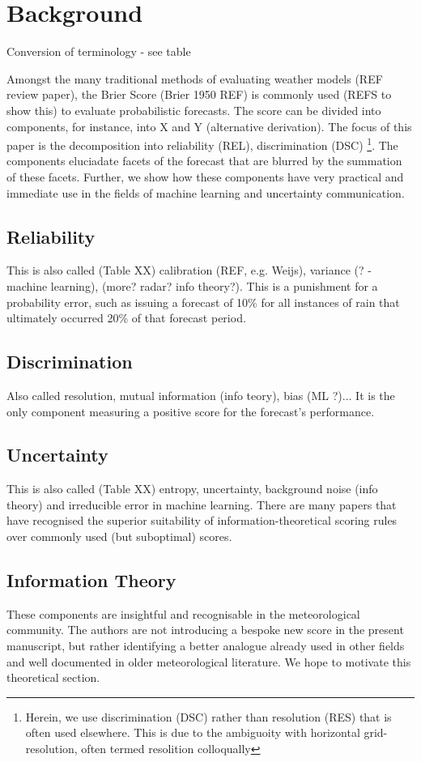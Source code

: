 \documentclass[draft]{ametsoc}
\begin{document}
\section{Background}
Conversion of terminology - see table

Amongst the many traditional methods of evaluating weather models (REF review paper), the Brier Score (Brier 1950 REF) is commonly used (REFS to show this) to evaluate probabilistic forecasts. The score can be divided into components, for instance, into X and Y (alternative derivation). The focus of this paper is the decomposition into reliability (REL), discrimination (DSC) \footnote{Herein, we use discrimination (DSC) rather than resolution (RES) that is often used elsewhere. This is due to the ambiguoity with horizontal grid-resolution, often termed resolition colloqually}. The components eluciadate facets of the forecast that are blurred by the summation of these facets. Further, we show how these components have very practical and immediate use in the fields of machine learning and uncertainty communication.

\subsection{Reliability}
This is also called (Table XX) calibration (REF, e.g. Weijs), variance (? - machine learning), (more? radar? info theory?). This is a punishment for a probability error, such as issuing a forecast of 10\% for all instances of rain that ultimately occurred 20\% of that forecast period.

\subsection{Discrimination}
Also called resolution, mutual information (info teory), bias (ML ?)... It is the only component measuring a positive score for the forecast's performance.

\subsection{Uncertainty}
This is also called (Table XX) entropy, uncertainty, background noise (info theory) and irreducible error in machine learning. There are many papers that have recognised the superior suitability of information-theoretical scoring rules over commonly used (but suboptimal) scores. 

\subsection{Information Theory}
These components are insightful and recognisable in the meteorological community. The authors are not introducing a bespoke new score in the present manuscript, but rather identifying a better analogue already used in other fields and well documented in older meteorological literature. We hope to motivate this theoretical section. 
\end{document}
